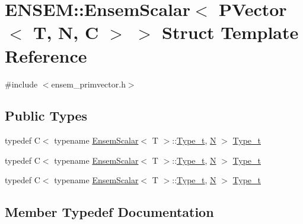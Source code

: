 \hypertarget{structENSEM_1_1EnsemScalar_3_01PVector_3_01T_00_01N_00_01C_01_4_01_4}{}\section{E\+N\+S\+EM\+:\+:Ensem\+Scalar$<$ P\+Vector$<$ T, N, C $>$ $>$ Struct Template Reference}
\label{structENSEM_1_1EnsemScalar_3_01PVector_3_01T_00_01N_00_01C_01_4_01_4}


{\ttfamily \#include $<$ensem\+\_\+primvector.\+h$>$}

\subsection*{Public Types}
\begin{DoxyCompactItemize}
\item 
typedef C$<$ typename \mbox{\hyperlink{structENSEM_1_1EnsemScalar}{Ensem\+Scalar}}$<$ T $>$\+::\mbox{\hyperlink{structENSEM_1_1EnsemScalar_3_01PVector_3_01T_00_01N_00_01C_01_4_01_4_a7301e4986b6b626a7c41055ad178ffac}{Type\+\_\+t}}, \mbox{\hyperlink{adat__devel_2lib_2hadron_2operator__name__util_8cc_a7722c8ecbb62d99aee7ce68b1752f337}{N}} $>$ \mbox{\hyperlink{structENSEM_1_1EnsemScalar_3_01PVector_3_01T_00_01N_00_01C_01_4_01_4_a7301e4986b6b626a7c41055ad178ffac}{Type\+\_\+t}}
\item 
typedef C$<$ typename \mbox{\hyperlink{structENSEM_1_1EnsemScalar}{Ensem\+Scalar}}$<$ T $>$\+::\mbox{\hyperlink{structENSEM_1_1EnsemScalar_3_01PVector_3_01T_00_01N_00_01C_01_4_01_4_a7301e4986b6b626a7c41055ad178ffac}{Type\+\_\+t}}, \mbox{\hyperlink{adat__devel_2lib_2hadron_2operator__name__util_8cc_a7722c8ecbb62d99aee7ce68b1752f337}{N}} $>$ \mbox{\hyperlink{structENSEM_1_1EnsemScalar_3_01PVector_3_01T_00_01N_00_01C_01_4_01_4_a7301e4986b6b626a7c41055ad178ffac}{Type\+\_\+t}}
\item 
typedef C$<$ typename \mbox{\hyperlink{structENSEM_1_1EnsemScalar}{Ensem\+Scalar}}$<$ T $>$\+::\mbox{\hyperlink{structENSEM_1_1EnsemScalar_3_01PVector_3_01T_00_01N_00_01C_01_4_01_4_a7301e4986b6b626a7c41055ad178ffac}{Type\+\_\+t}}, \mbox{\hyperlink{adat__devel_2lib_2hadron_2operator__name__util_8cc_a7722c8ecbb62d99aee7ce68b1752f337}{N}} $>$ \mbox{\hyperlink{structENSEM_1_1EnsemScalar_3_01PVector_3_01T_00_01N_00_01C_01_4_01_4_a7301e4986b6b626a7c41055ad178ffac}{Type\+\_\+t}}
\end{DoxyCompactItemize}


\subsection{Member Typedef Documentation}
\mbox{\label{structENSEM_1_1EnsemScalar_3_01PVector_3_01T_00_01N_00_01C_01_4_01_4_a7301e4986b6b626a7c41055ad178ffac}} 
